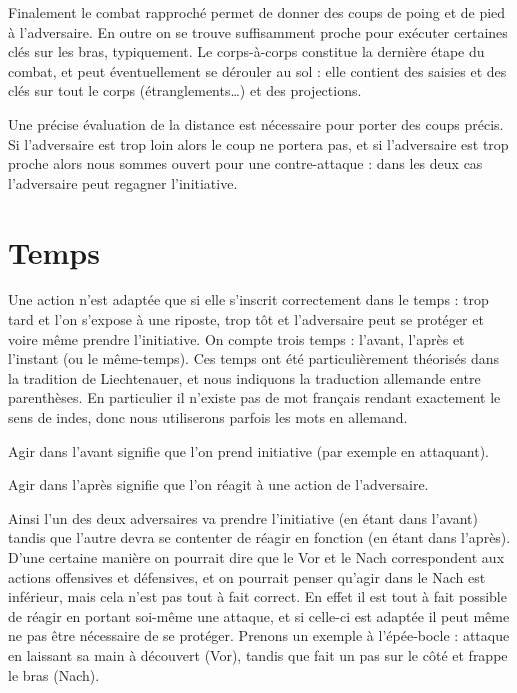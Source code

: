 Finalement le combat rapproché permet de donner des coups de poing et de pied à l'adversaire.
En outre on se trouve suffisamment proche pour exécuter certaines clés sur les bras, typiquement.
Le corps-à-corps constitue la dernière étape du combat, et peut éventuellement se dérouler au sol : elle contient des saisies et des clés sur tout le corps (étranglements…) et des projections.

Une précise évaluation de la distance est nécessaire pour porter des coups précis.
Si l'adversaire est trop loin alors le coup ne portera pas, et si l'adversaire est trop proche alors nous sommes ouvert pour une contre-attaque : dans les deux cas l'adversaire peut regagner l'initiative.


\section{Temps}



Une action n'est adaptée que si elle s'inscrit correctement dans le temps : trop tard et l'on s'expose à une riposte, trop tôt et l'adversaire peut se protéger et voire même prendre l'initiative.
On compte trois temps : l'avant, l'après et l'instant (ou le même-temps).
Ces temps ont été particulièrement théorisés dans la tradition de Liechtenauer, et nous indiquons la traduction allemande entre parenthèses.
En particulier il n'existe pas de mot français rendant exactement le sens de indes, donc nous utiliserons parfois les mots en allemand.


\begin{definition}

Agir dans l'avant signifie que l'on prend initiative (par exemple en attaquant).
\end{definition}


\begin{definition}

Agir dans l'après signifie que l'on réagit à une action de l'adversaire.
\end{definition}


Ainsi l'un des deux adversaires va prendre l'initiative (en étant dans l'avant) tandis que l'autre devra se contenter de réagir en fonction (en étant dans l'après).
D'une certaine manière on pourrait dire que le Vor et le Nach correspondent aux actions offensives et défensives, et on pourrait penser qu'agir dans le Nach est inférieur, mais cela n'est pas tout à fait correct.
En effet il est tout à fait possible de réagir en portant soi-même une attaque, et si celle-ci est adaptée il peut même ne pas être nécessaire de se protéger.
Prenons un exemple à l'épée-bocle : \A attaque en laissant sa main à découvert (Vor), tandis que \D fait un pas sur le côté et frappe le bras (Nach).

